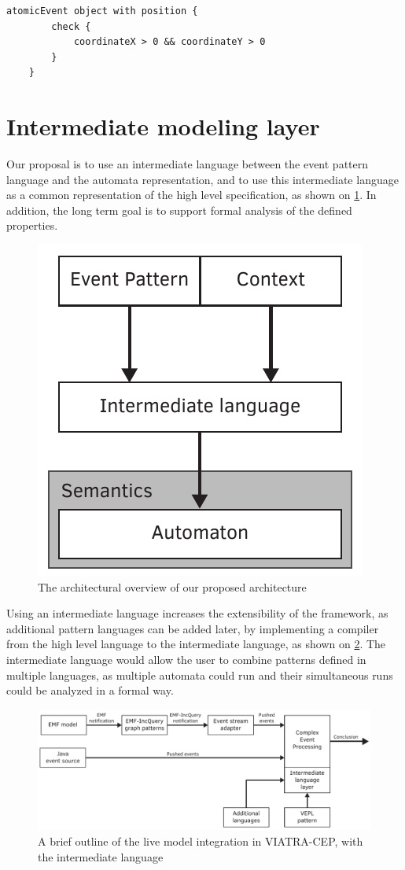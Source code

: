 \begin{lstlisting}[caption={Example of the Check expression in VIATRA-CEP},label={fig:viatracep:check}]
	atomicEvent object with position {
		check {
			coordinateX > 0 && coordinateY > 0
		}
	}
\end{lstlisting}



\section{Intermediate modeling layer}
Our proposal is to use an intermediate language between the event pattern language and the automata representation, and to use this intermediate language as a common representation of the high level specification, as shown on \cref{fig:viatracep:newcep}. In addition, the long term goal is to support formal analysis of the defined properties. 


\begin{figure}[h]
	\centering
	\includegraphics[width=0.4\linewidth]{figures/chapter_3/newcep}
	\caption{The architectural overview of our proposed architecture}
	\label{fig:viatracep:newcep}
\end{figure}


Using an intermediate language increases the extensibility of the framework, as additional pattern languages can be added later, by implementing a compiler from the high level language to the intermediate language, as shown on \cref{fig:viatracep:newinputs}.
The intermediate language would allow the user to combine patterns defined in multiple languages, as multiple automata could run and their simultaneous runs could be analyzed in a formal way.


\begin{figure}[h]
	\centering
	\includegraphics[width=0.9\linewidth]{figures/chapter_3/newinput}
	\caption{A brief outline of the live model integration in VIATRA-CEP, with the intermediate language \redraw}
	\label{fig:viatracep:newinputs}
\end{figure}